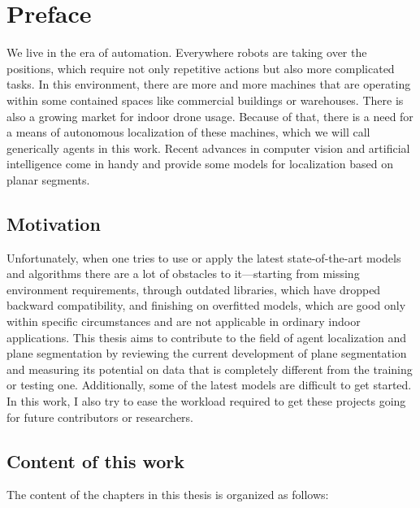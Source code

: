 
\chapter{Preface}

We live in the era of automation.
Everywhere robots are taking over the positions, which require not only repetitive actions but also more complicated tasks.
In this environment, there are more and more machines that are operating within some contained spaces like commercial buildings or warehouses.
There is also a growing market for indoor drone usage.
Because of that, there is a need for a means of autonomous localization of these machines, which we will call generically agents in this work.
Recent advances in computer vision and artificial intelligence come in handy and provide some models for localization based on planar segments.

\section{Motivation}

Unfortunately, when one tries to use or apply the latest state-of-the-art models and algorithms there are a lot of obstacles to it—starting from
missing environment requirements, through outdated libraries, which have dropped backward compatibility,
and finishing on overfitted models, which are good only within specific circumstances and are not applicable in ordinary indoor applications.
This thesis aims to contribute to the field of agent localization and plane segmentation
by reviewing the current development of plane segmentation and measuring its potential on data
that is completely different from the training or testing one.
Additionally, some of the latest models are difficult to get started.
In this work, I also try to ease the workload required to get these projects going for future contributors or researchers.

\section{Content of this work}

The content of the chapters in this thesis is organized as follows:


